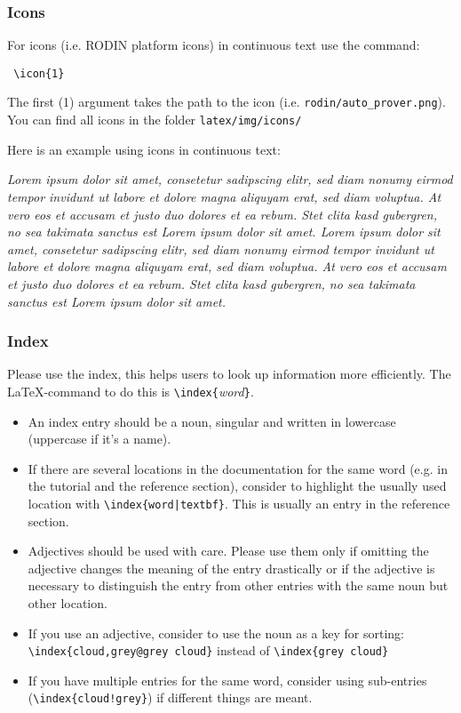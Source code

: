 \subsubsection{Icons}

For icons (i.e. RODIN platform icons) in continuous text use the command: 

\begin{verbatim} \icon{1} \end{verbatim} 

The first (1) argument takes the path to the icon (i.e. \texttt{rodin/auto\_prover.png}). You can find all icons in the folder \texttt{latex/img/icons/}

Here is an example using icons in continuous text:

\textit{Lorem ipsum dolor sit amet, consetetur  sadipscing elitr, sed diam nonumy eirmod tempor invidunt ut labore et dolore magna aliquyam erat, sed diam voluptua. At vero eos et accusam et justo duo dolores et ea rebum. Stet clita kasd gubergren, no sea takimata sanctus est Lorem ipsum dolor sit amet. Lorem ipsum dolor sit amet, consetetur sadipscing elitr, sed diam nonumy eirmod tempor invidunt ut labore et dolore  magna aliquyam erat, sed diam voluptua. At vero eos et accusam et justo duo dolores et ea rebum. Stet clita kasd gubergren, no sea takimata sanctus est Lorem ipsum dolor sit amet.}

\subsubsection{Index}
Please use the index, this helps users to look up information more efficiently.
The \LaTeX-command to do this is \verb#\index{#\textit{word}\verb#}#.
\begin{itemize}
\item An index entry should be a noun, singular and written in lowercase (uppercase if it's a name).
\item If there are several locations in the documentation for the same word (e.g. in the tutorial and the
  reference section), consider to highlight the usually used location with \verb#\index{word|textbf}#.
  This is usually an entry in the reference section.
\item Adjectives should be used with care. 
  Please use them only if omitting the adjective changes the meaning of the entry drastically or
  if the adjective is necessary to distinguish the entry from other entries with the same noun but
  other location.
\item If you use an adjective, consider to use the noun as a key for sorting: \verb#\index{cloud,grey@grey cloud}#
  instead of \verb#\index{grey cloud}#
\item If you have multiple entries for the same word, consider using sub-entries (\verb#\index{cloud!grey}#)
  if different things are meant.
\end{itemize}

